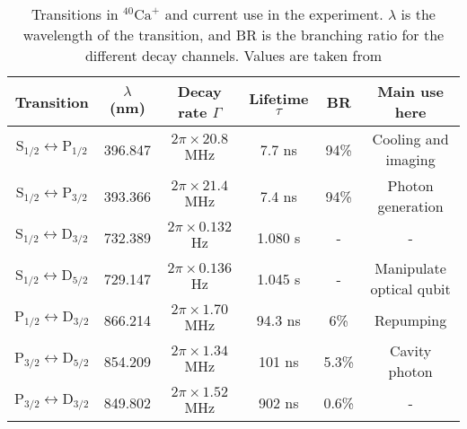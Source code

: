 \begin{table}[H]
\centering
\begin{tabular}{c c c c c c}
 \toprule
    {Transition} & { $\lambda$ (nm)} & {Decay rate $\Gamma$} & Lifetime $\tau$ & BR & {Main use here} \\ \midrule
   $\text{S}_{1/2} \leftrightarrow \text{P}_{1/2}$ & 396.847 & $2\pi \times 20.8$ MHz & 7.7 ns & 94\% &Cooling and imaging \\
    $\text{S}_{1/2} \leftrightarrow \text{P}_{3/2}$  & 393.366 & $2\pi \times 21.4$ MHz & 7.4 ns & 94\% &Photon generation\\ \midrule
   $\text{S}_{1/2} \leftrightarrow \text{D}_{3/2}$ & 732.389 & $2\pi \times 0.132$ Hz & 1.080 s & - & - \\
    $\text{S}_{1/2} \leftrightarrow \text{D}_{5/2}$  & 729.147 & $2\pi \times 0.136$ Hz & 1.045 s & - & Manipulate optical qubit \\\midrule
    $\text{P}_{1/2} \leftrightarrow \text{D}_{3/2}$  & 866.214 &  $2\pi \times 1.70$ MHz  &  94.3 ns & 6\% & Repumping \\
    $\text{P}_{3/2} \leftrightarrow \text{D}_{5/2}$  & 854.209 & $2\pi \times 1.34$ MHz & 101 ns & 5.3\%  & Cavity photon  \\
    $\text{P}_{3/2} \leftrightarrow \text{D}_{3/2}$  & 849.802 & $2\pi \times 1.52$ MHz  & 902 ns & 0.6\%  & - \\ \bottomrule
\end{tabular}
\caption{Transitions in $^{40}\text{Ca}^+$ and current use in the experiment. $\lambda$ is the wavelength of the transition, and BR is the branching ratio for the different decay channels. Values are taken from \cite{ion_spacing,stute}}
\label{transitiontable}
\end{table}

